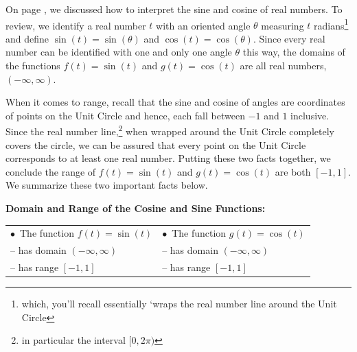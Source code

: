 \documentclass{ximera}
\begin{document}
	\author{Stitz-Zeager}




\setcounter{footnote}{0}

\label{GraphsofSineandCosine}

On page \pageref{cosinesineequationsrealnumbers}, we discussed how to interpret the sine and cosine of real numbers.  To review, we identify a real number  $t$ with an oriented angle $\theta$ measuring $t$ radians\footnote{which, you'll recall  essentially `wraps the real number line around the Unit Circle}   and define $\sin(t) = \sin(\theta)$ and $\cos(t) = \cos(\theta)$.  Since every real number can be identified with one and only one angle $\theta$ this way, the domains of the functions $f(t) = \sin(t)$ and $g(t) = \cos(t)$ are all real numbers, $(-\infty, \infty)$.



When it comes to range, recall that the sine and cosine of angles are coordinates of points on the Unit Circle and hence, each  fall between $-1$ and $1$ inclusive.  Since the real number line,\footnote{in particular the interval $[0, 2\pi)$} when wrapped around the Unit Circle completely covers the circle, we can be assured that every point on the Unit Circle corresponds to at least one real number.  Putting these two facts together, we conclude the range of $f(t) = \sin(t)$ and $g(t) = \cos(t)$ are both $[-1,1]$.  We summarize these two important facts below.





\begin{theorem} \label{cosinesinefunctiondomainrange}  \textbf{Domain and Range of the Cosine and Sine Functions:} 

\begin{tabular}{ll}

 $\bullet \, $ The function $f(t) = \sin(t)$ &  $\bullet \, $ The function $g(t) = \cos(t)$  \\
 
\qquad -- has domain $(-\infty, \infty)$ & \qquad -- has domain $(-\infty, \infty)$  \\
 
\qquad -- has range $[-1,1]$ & \qquad -- has range $[-1,1]$ \\ 

\end{tabular}

\end{theorem}
\end{document}
